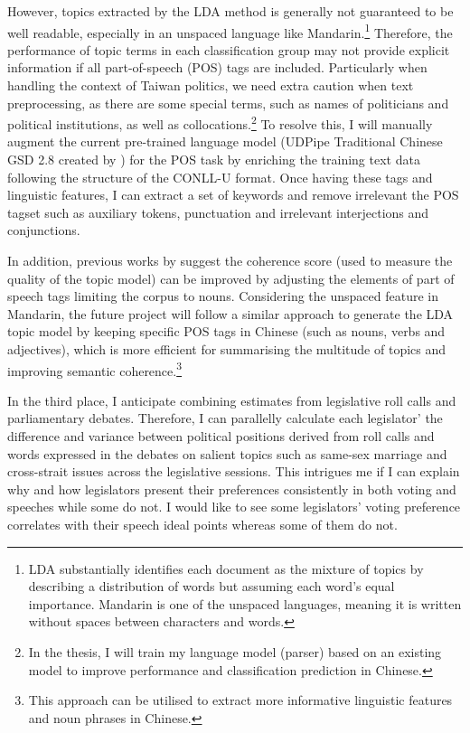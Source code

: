 However, topics extracted by the LDA method is generally not guaranteed to be well readable, especially in an unspaced language like Mandarin.\footnote{LDA substantially identifies each document as the mixture of topics by describing a distribution of words but assuming each word's equal importance. Mandarin is one of the unspaced languages, meaning it is written without spaces between characters and words.} Therefore, the performance of topic terms in each classification group may not provide explicit information if all part-of-speech (POS) tags are included. Particularly when handling the context of Taiwan politics, we need extra caution when text preprocessing, as there are some special terms, such as names of politicians and political institutions, as well as collocations.\footnote{In the thesis, I will train my language model (parser) based on an existing model to improve performance and classification prediction in Chinese.} To resolve this, I will manually augment the current pre-trained language model (UDPipe Traditional Chinese GSD 2.8 created by \cite{Straka2016, Straka2017}) for the POS task by enriching the training text data following the structure of the CONLL-U format. Once having these tags and linguistic features, I can extract a set of keywords and remove irrelevant the POS tagset such as auxiliary tokens, punctuation and irrelevant interjections and conjunctions.

In addition, previous works by \citet{Yu2013, Martin2015, Lau2014} suggest the coherence score (used to measure the quality of the topic model) can be improved by adjusting the elements of part of speech tags \textemdash limiting the corpus to nouns. Considering the unspaced feature in Mandarin, the future project will follow a similar approach to generate the LDA topic model by keeping specific POS tags in Chinese (such as nouns, verbs and adjectives), which is more efficient for summarising the multitude of topics and improving semantic coherence.\footnote{This approach can be utilised to extract more informative linguistic features and noun phrases in Chinese.}

In the third place, I anticipate combining estimates from legislative roll calls and parliamentary debates. Therefore, I can parallelly calculate each legislator' the difference and variance between political positions derived from roll calls and words expressed in the debates on salient topics such as same-sex marriage and cross-strait issues across the legislative sessions. This intrigues me if I can explain why and how legislators present their preferences consistently in both voting and speeches while some do not. I would like to see some legislators' voting preference correlates with their speech ideal points whereas some of them do not. 

